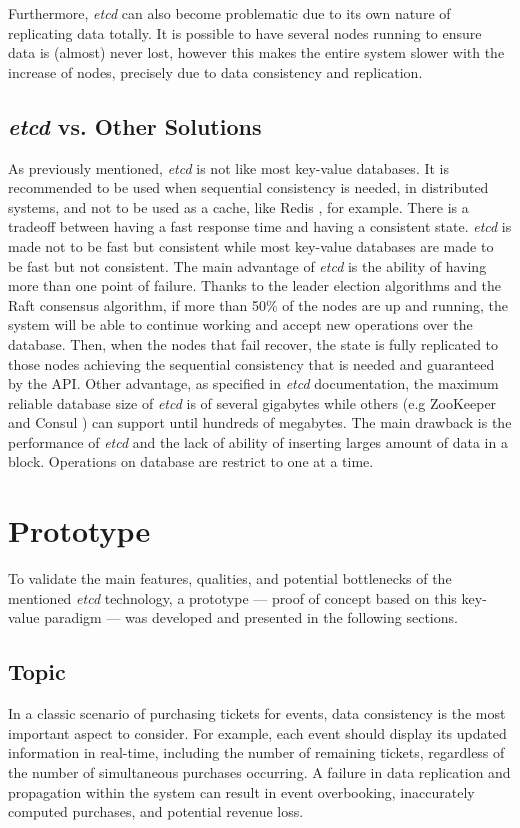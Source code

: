 \documentclass[screen,review]{acmart}
\begin{document}
Furthermore, \textit{etcd} can also become problematic due to its own nature of replicating data totally. It is possible to have several nodes running to ensure data is (almost) never lost, however this makes the entire system slower with the increase of nodes, precisely due to data consistency and replication.

\subsection{\textit{etcd} vs. Other Solutions}
As previously mentioned, \textit{etcd} is not like most key-value databases. It is recommended to be used when sequential consistency is needed, in distributed systems, and not to be used as a cache, like Redis \cite{redis}, for example. There is a tradeoff between having a fast response time and having a consistent state. \textit{etcd} is made not to be fast but consistent while most key-value databases are made to be fast but not consistent.
The main advantage of \textit{etcd} is the ability of having more than one point of failure. Thanks to the leader election algorithms and the Raft consensus algorithm, if more than 50\% of the nodes are up and running, the system will be able to continue working and accept new operations over the database. Then, when the nodes that fail recover, the state is fully replicated to those nodes achieving the sequential consistency that is needed and guaranteed by the API.
Other advantage, as specified in \textit{etcd} documentation, the maximum reliable database size of \textit{etcd} is of several gigabytes while others (e.g ZooKeeper \cite{zoo} and Consul \cite{consul}) can support until hundreds of megabytes.
The main drawback is the performance of \textit{etcd} and the lack of ability of inserting larges amount of data in a block. Operations on database are restrict to one at a time.

\section{Prototype}
To validate the main features, qualities, and potential bottlenecks of the mentioned \textit{etcd} technology, a prototype — proof of concept based on this key-value paradigm — was developed and presented in the following sections.

\subsection{Topic}
In a classic scenario of purchasing tickets for events, data consistency is the most important aspect to consider. For example, each event should display its updated information in real-time, including the number of remaining tickets, regardless of the number of simultaneous purchases occurring. A failure in data replication and propagation within the system can result in event overbooking, inaccurately computed purchases, and potential revenue loss.
\end{document}
